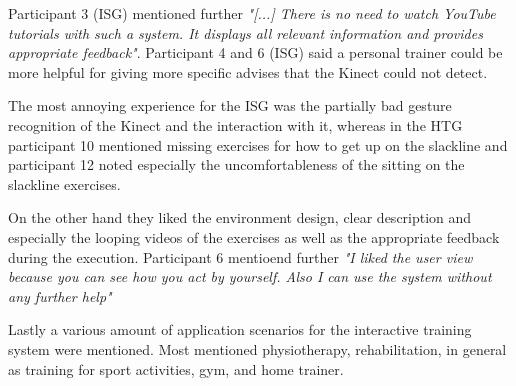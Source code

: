 Participant 3 (ISG) mentioned further \textit{"[...] There is no need to watch YouTube tutorials with such a system. It displays all relevant information and provides appropriate feedback"}.
Participant 4 and 6 (ISG) said a personal trainer could be more helpful for giving more specific advises that the Kinect could not detect.

The most annoying experience for the ISG was the partially bad gesture recognition of the Kinect and the interaction with it, whereas in the HTG participant 10 mentioned missing exercises for how to get up on the slackline and participant 12 noted especially the uncomfortableness of the sitting on the slackline exercises.

On the other hand they liked the environment design, clear description and especially the looping videos of the exercises as well as the appropriate feedback during the execution.
Participant 6 mentioend further \textit{"I liked the user view because you can see how you act by yourself. Also I can use the system without any further help"}

Lastly a various amount of application scenarios for the interactive training system were mentioned.
Most mentioned physiotherapy, rehabilitation, in general as training for sport activities, gym, and home trainer.